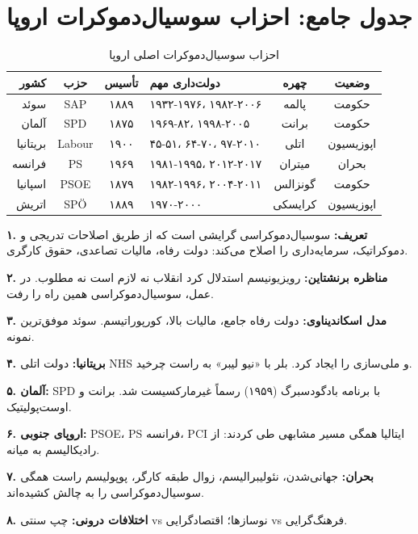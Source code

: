 \section{جدول جامع: احزاب سوسیال‌دموکرات اروپا}

\begin{table}[htbp]
\centering
\caption{احزاب سوسیال‌دموکرات اصلی اروپا}
\label{tab:socdem-parties}
\footnotesize
\begin{tabularx}{\linewidth}{r|c|c|>{\centering\arraybackslash}X|c|c}
\toprule
\textbf{کشور} & \textbf{حزب} & \textbf{تأسیس} & \textbf{دولت‌داری مهم} & \textbf{چهره} & \textbf{وضعیت} \\
\midrule
سوئد & SAP & ۱۸۸۹ & ۱۹۳۲-۱۹۷۶، ۱۹۸۲-۲۰۰۶ & پالمه & حکومت \\
\midrule
آلمان & SPD & ۱۸۷۵ & ۱۹۶۹-۸۲، ۱۹۹۸-۲۰۰۵ & برانت & حکومت \\
\midrule
بریتانیا & Labour & ۱۹۰۰ & ۴۵-۵۱، ۶۴-۷۰، ۹۷-۲۰۱۰ & اتلی & اپوزیسیون \\
\midrule
فرانسه & PS & ۱۹۶۹ & ۱۹۸۱-۱۹۹۵، ۲۰۱۲-۲۰۱۷ & میتران & بحران \\
\midrule
اسپانیا & PSOE & ۱۸۷۹ & ۱۹۸۲-۱۹۹۶، ۲۰۰۴-۲۰۱۱ & گونزالس & حکومت \\
\midrule
اتریش & SPÖ & ۱۸۸۹ & ۱۹۷۰-۲۰۰۰ & کرایسکی & اپوزیسیون \\
\bottomrule
\end{tabularx}
\end{table}


\begin{summarybox}

\textbf{۱. تعریف:} سوسیال‌دموکراسی گرایشی است که از طریق اصلاحات تدریجی و دموکراتیک، سرمایه‌داری را اصلاح می‌کند: دولت رفاه، مالیات تصاعدی، حقوق کارگری.

\textbf{۲. مناظره برنشتاین:} رویزیونیسم استدلال کرد انقلاب نه لازم است نه مطلوب. در عمل، سوسیال‌دموکراسی همین راه را رفت.

\textbf{۳. مدل اسکاندیناوی:} دولت رفاه جامع، مالیات بالا، کورپوراتیسم. سوئد موفق‌ترین نمونه.

\textbf{۴. بریتانیا:} دولت اتلی NHS و ملی‌سازی را ایجاد کرد. بلر با «نیو لیبر» به راست چرخید.

\textbf{۵. آلمان:} SPD با برنامه بادگودسبرگ (۱۹۵۹) رسماً غیرمارکسیست شد. برانت و اوست‌پولیتیک.

\textbf{۶. اروپای جنوبی:} PSOE، PS فرانسه، PCI ایتالیا همگی مسیر مشابهی طی کردند: از رادیکالیسم به میانه.

\textbf{۷. بحران:} جهانی‌شدن، نئولیبرالیسم، زوال طبقه کارگر، پوپولیسم راست همگی سوسیال‌دموکراسی را به چالش کشیده‌اند.

\textbf{۸. اختلافات درونی:} چپ سنتی vs نوسازها؛ اقتصادگرایی vs فرهنگ‌گرایی.

\end{summarybox}


